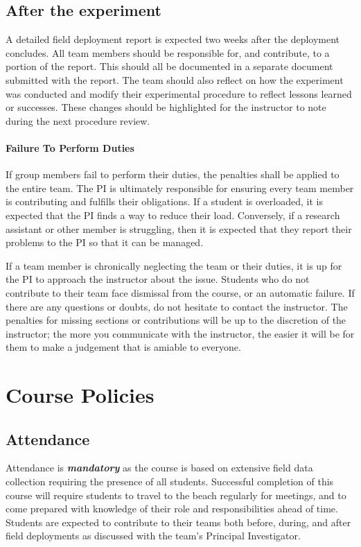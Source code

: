 \documentclass[
	letterpaper, %
	fontsize=10pt, %
	twoside=true, %
	numbers=noenddot, %
]{kaobook}
\begin{document}
\subsection*{After the experiment}
A detailed field deployment report is expected two weeks after the deployment concludes.
All team members should be responsible for, and contribute, to a portion of the report.
This should all be documented in a separate document submitted with the report.
The team should also reflect on how the experiment was conducted and modify their experimental procedure to reflect lessons learned or successes.
These changes should be highlighted for the instructor to note during the next procedure review.

\paragraph*{Failure To Perform Duties} If group members fail to perform their duties, the penalties shall be applied to the entire team.
The PI is ultimately responsible for ensuring every team member is contributing and fulfills their obligations.
If a student is overloaded, it is expected that the PI finds a way to reduce their load.
Conversely, if a research assistant or other member is struggling, then it is expected that they report their problems to the PI so that it can be managed.

If a team member is chronically neglecting the team or their duties, it is up for the PI to approach the instructor about the issue.
Students who do not contribute to their team face dismissal from the course, or an automatic failure.
If there are any questions or doubts, do not hesitate to contact the instructor.
The penalties for missing sections or contributions will be up to the discretion of the instructor; the more you communicate with the instructor, the easier it will be for them to make a judgement that is amiable to everyone.

\section*{Course Policies} 
\subsection*{Attendance} \label{ssec:attendance}
Attendance is \textbf{\emph{mandatory}} as the course is based on extensive field data collection requiring the presence of all students. 
Successful completion of this course will require students to travel to the beach regularly for meetings, and to come prepared with knowledge of their role and responsibilities ahead of time.
Students are expected to contribute to their teams both before, during, and after field deployments as discussed with the team's Principal Investigator.
\end{document}
